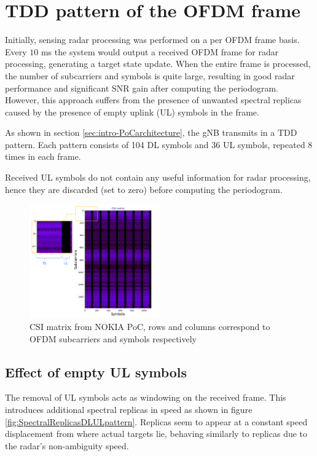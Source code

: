 \chapter{TDD pattern of the OFDM frame}
\label{chap:TDD pattern of the OFDM frame}


Initially, sensing radar processing was performed on a per OFDM frame basis. \protect\newline Every $10$ ms the system would output a received OFDM frame for radar processing, generating a target state update. When the entire frame is processed, the number of subcarriers and symbols is quite large, resulting in good radar performance and significant SNR gain after computing the periodogram. However, this approach suffers from the presence of unwanted spectral replicas caused by the presence of empty uplink (UL) symbols in the frame.
    
As shown in section \ref{sec:intro-PoCarchitecture}, the gNB transmits in a TDD pattern. Each pattern consists of 104 DL symbols and 36 UL symbols, repeated 8 times in each frame.

Received UL symbols do not contain any useful information for radar processing, hence they are discarded (set to zero) before computing the periodogram.

\begin{figure}[H]
    \centering
    \includegraphics[width=0.5\textwidth]{Images/TDDprocessing/CSIMatrix_DLULpattern.png}
    \caption{CSI matrix from NOKIA PoC, rows and columns correspond to OFDM subcarriers and symbols respectively}
    \label{fig:CSIMatrix_DLULpattern}
\end{figure}

\section{Effect of empty UL symbols}
    
    The removal of UL symbols acts as windowing on the received frame. This introduces additional spectral replicas in speed as shown in figure \ref{fig:SpectralReplicasDLULpattern}. Replicas seem to appear at a constant speed displacement from where actual targets lie, behaving similarly to replicas due to the radar's non-ambiguity speed.
    
